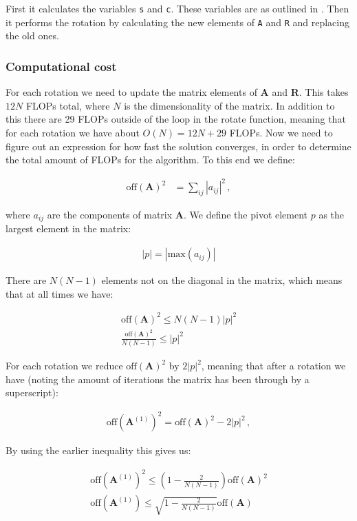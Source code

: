 \documentclass[reprint,english,notitlepage]{revtex4-1}  %
\begin{document}
First it calculates the variables \verb+s+ and \verb+c+. These variables are as outlined in \citep{Hjorth-Jensen2015}. Then it performs the rotation by calculating the new elements of \verb+A+ and \verb+R+ and replacing the old ones.

\subsubsection{Computational cost} \label{sec:III:a:i}

For each rotation we need to update the matrix elements of \textbf{A} and \textbf{R}. This takes $12N$ FLOPs total, where $N$ is the dimensionality of the matrix. In addition to this there are 29 FLOPs outside of the loop in the rotate function, meaning that for each rotation we have about $O(N) = 12N + 29$ FLOPs. Now we need to figure out an expression for how fast the solution converges, in order to determine the total amount of FLOPs for the algorithm. To this end we define:

\begin{align*}
\text{off}(\textbf{A})^2 &= \sum\limits_{ij} |a_{ij}|^2 \, ,
\end{align*}

where $a_{ij}$ are the components of matrix \textbf{A}. We define the pivot element $p$ as the largest element in the matrix:

\begin{align*}
|p| = |\text{max}(a_{ij})|
\end{align*}

There are $N(N-1)$ elements not on the diagonal in the matrix, which means that at all times we have:

\begin{align*}
\text{off}(\textbf{A})^2 \leq N(N-1)|p|^2 \\
\frac{\text{off}(\textbf{A})^2}{N(N-1)} \leq |p|^2
\end{align*}

For each rotation we reduce $\text{off}(\textbf{A})^2$ by $2|p|^2$, meaning that after a rotation we have (noting the amount of iterations the matrix has been through by a superscript):

\begin{align*}
\text{off}(\textbf{A}^{(1)})^2 = \text{off}(\textbf{A})^2 - 2|p|^2 \, ,
\end{align*}

By using the earlier inequality this gives us:

\begin{align*}
\text{off}(\textbf{A}^{(1)})^2 \leq (1 - \frac{2}{N(N-1)}) \text{off}(\textbf{A})^2 \\
\text{off}(\textbf{A}^{(1)}) \leq \sqrt{1 - \frac{2}{N(N-1)}} \text{off}(\textbf{A})
\end{align*}
\end{document}
